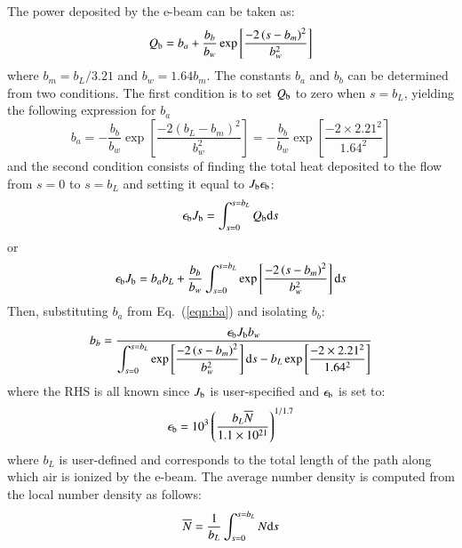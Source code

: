 \documentclass{warpdoc}
\newcommand{\mfd}{\displaystyle}
\begin{document}
 The power deposited by the e-beam can be taken as:
%
\begin{equation}
  Q_{\rm b} = b_a + \frac{b_b}{b_w} \exp \left[ \frac{-2 \left( s- b_m \right)^2}{b_w^2 }  \right]
\end{equation}
%
where $b_m=b_{L}/3.21$ and $b_w=1.64 b_m$. The constants $b_a$ and $b_b$ can be determined from two conditions.
The first condition is to set $Q_{\rm b}$ to zero when $s=b_{L}$, yielding the following expression for $b_a$
%
\begin{equation}
  b_a =  - \frac{b_b}{b_w} \exp \left[ \frac{-2 \left( b_{L}- b_m \right)^2}{b_w^2 }  \right]
      =  - \frac{b_b}{b_w} \exp \left[ \frac{-2 \times 2.21^2}{1.64^2 }  \right]
  \label{eqn:ba}
\end{equation}
%
and the second condition consists of finding the total heat deposited to the flow from $s=0$ to $s=b_{L}$ and setting it equal to $J_{\rm b} \epsilon_{\rm b}$:
%
\begin{equation}
  \epsilon_{\rm b} J_{\rm b}= \int_{s=0}^{s=b_{L}} Q_{\rm b} {\rm d} s
\end{equation}
%
or
%
\begin{equation}
  \epsilon_{\rm b} J_{\rm b}=  
   b_{a} b_{L}  +    \frac{b_b}{b_w} \int_{s=0}^{s=b_{L}} 
\exp \left[ \frac{-2 \left( s- b_m \right)^2}{b_w^2 }  \right]
   {\rm d} s
\end{equation}
%
Then, substituting $b_a$ from Eq.\ (\ref{eqn:ba}) and isolating $b_b$:
%
\begin{equation}
  {b_b}=  
\frac{
\epsilon_{\rm b} J_{\rm b} b_w
}{\mfd      \int_{s=0}^{s=b_L} 
\exp \left[ \frac{-2 \left( s- b_m \right)^2}{b_w^2 }  \right]
   {\rm d} s
   - b_{L} \exp \left[ \frac{-2 \times 2.21^2}{1.64^2 }  \right] 
}
\end{equation}
%
where the RHS is all known since $J_{\rm b}$ is user-specified and $\epsilon_{\rm b}$ is set to:
%
\begin{equation}
  \epsilon_{\rm b} = 10^3 \left(\frac{b_{L} \overline{N}}{1.1 \times 10^{21}}  \right)^{1/1.7}
\end{equation}
%
where $b_{L}$ is user-defined and corresponds to the total length of the path along which air is ionized by the e-beam. The average number density is computed from the local number density as follows:
%
\begin{equation}
  \overline{N} = \frac{1}{b_{L}} \int_{s=0}^{s=b_{L}} N {\rm d} s
\end{equation}
% 
\end{document}
